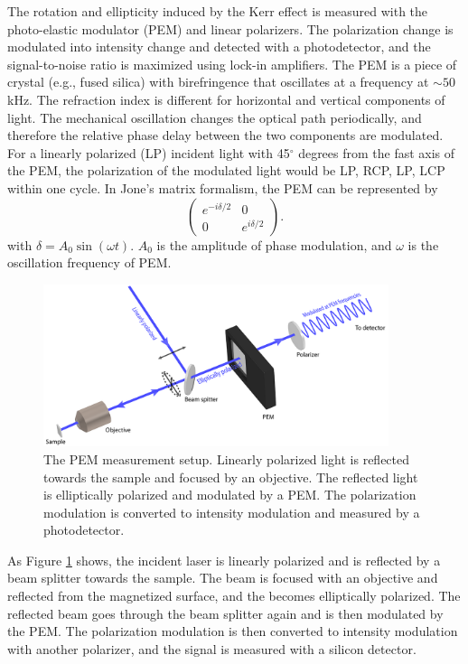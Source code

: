 \documentclass[pdflatex, sectionletters, 12pt, final, phd]{pittetd}    %
\begin{document}
The rotation and ellipticity induced by the Kerr effect is measured with the photo-elastic modulator (PEM) and linear polarizers. The polarization change is modulated into intensity change and detected with a photodetector, and the signal-to-noise ratio is maximized using lock-in amplifiers. The PEM is a piece of crystal (e.g., fused silica) with birefringence that oscillates at a frequency at $\sim 50$ kHz. The refraction index is different for horizontal and vertical components of light. The mechanical oscillation changes the optical path periodically, and therefore the relative phase delay between the two components are modulated. For a linearly polarized (LP) incident light with 45$^{\circ}$ degrees from the fast axis of the PEM, the polarization of the modulated light would be LP, RCP, LP, LCP within one cycle. In Jone's matrix formalism, the PEM can be represented by
$$
\begin{pmatrix}
e^{-i\delta/2} & 0 \\
0 & e^{i\delta/2}
\end{pmatrix}.
$$ 
with $\delta = A_0 \sin (\omega t)$. $A_0$ is the amplitude of phase modulation, and $\omega$ is the oscillation frequency of PEM.

\begin{figure}[h!]
	\centering
	\includegraphics[width=0.9\textwidth]{Drawing/PEMOptics_small.png}
	\caption[The PEM measurement setup]{The PEM measurement setup. Linearly polarized light is reflected towards the sample and focused by an objective. The reflected light is elliptically polarized and modulated by a PEM. The polarization modulation is converted to intensity modulation and measured by a photodetector.}
	\label{FIG:PEMOptics}
\end{figure}

As Figure \ref{FIG:PEMOptics} shows, the incident laser is linearly polarized and is reflected by a beam splitter towards the sample. The beam is focused with an objective and reflected from the magnetized surface, and the becomes elliptically polarized. The reflected beam goes through the beam splitter again and is then modulated by the PEM. The polarization modulation is then converted to intensity modulation with another polarizer, and the signal is measured with a silicon detector.
\end{document}
